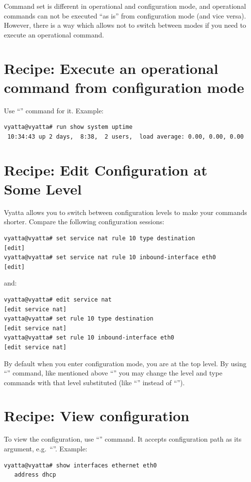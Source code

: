 Command set is different in operational and configuration mode, and operational commands can not be executed
``as is'' from configuration mode (and vice versa). However, there is a way which allows not to switch between modes 
if you need to execute an operational command.

\section{Recipe: Execute an operational command from configuration mode}
\solution
Use ``'' command for it. Example:
\begin{verbatim}
vyatta@vyatta# run show system uptime 
 10:34:43 up 2 days,  8:38,  2 users,  load average: 0.00, 0.00, 0.00
\end{verbatim}

\section{Recipe: Edit Configuration at Some Level}
\solution
Vyatta allows you to switch between configuration levels to make your commands shorter. Compare the following
configuration sessions:
\begin{verbatim}
vyatta@vyatta# set service nat rule 10 type destination 
[edit]
vyatta@vyatta# set service nat rule 10 inbound-interface eth0
[edit]
\end{verbatim}
and:
\begin{verbatim}
vyatta@vyatta# edit service nat 
[edit service nat]
vyatta@vyatta# set rule 10 type destination 
[edit service nat]
vyatta@vyatta# set rule 10 inbound-interface eth0
[edit service nat]
\end{verbatim}
By default when you enter configuration mode, you are at the top level. By using ``'' command,
like mentioned above ``'' you may change the level and type commands with that level
substituted (like ``'' instead of 
``'').

\section{Recipe: View configuration}
\solution
To view the configuration, use ``'' command. It accepts configuration path as its argument, 
e.g.~``''. Example:
\begin{verbatim}
vyatta@vyatta# show interfaces ethernet eth0
   address dhcp
\end{verbatim}

